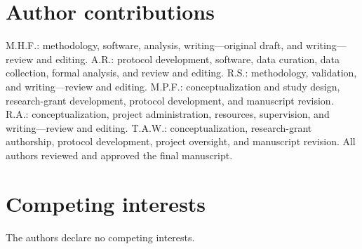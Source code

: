 \documentclass[pdflatex,sn-nature,iicol]{sn-jnl}
\begin{document}
\section*{Author contributions}
M.H.F.: methodology, software, analysis, writing---original draft, and writing---review and editing. A.R.: protocol development, software, data curation, data collection, formal analysis, and review and editing. R.S.: methodology, validation, and writing---review and editing. M.P.F.: conceptualization and study design, research-grant development, protocol development, and manuscript revision. R.A.: conceptualization, project administration, resources, supervision, and writing---review and editing. T.A.W.: conceptualization, research-grant authorship, protocol development, project oversight, and manuscript revision. All authors reviewed and approved the final manuscript.

\section*{Competing interests}
The authors declare no competing interests.


\end{document}
